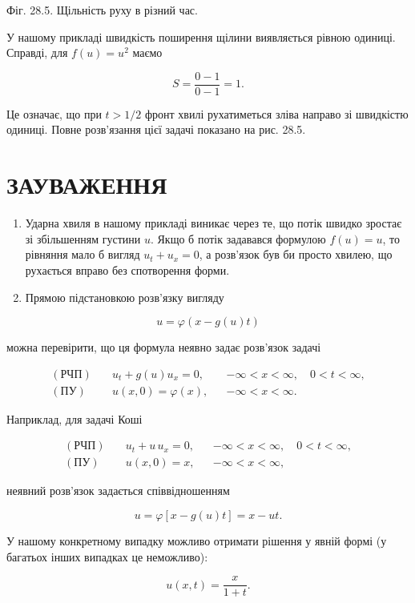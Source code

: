 \documentclass[
  ukrainian,
]{article}
\begin{document}
Фіг. 28.5. Щільність руху в різний час.

У нашому прикладі швидкість поширення щілини виявляється рівною одиниці.
Справді, для \(f(u)=u^2\) маємо

\[
S=\frac{0-1}{0-1}=1.
\]

Це означає, що при \(t>1/2\) фронт хвилі рухатиметься зліва направо зі
швидкістю одиниці. Повне розв'язання цієї задачі показано на рис. 28.5.

\section{ЗАУВАЖЕННЯ}\label{ux437ux430ux443ux432ux430ux436ux435ux43dux43dux44f-10}

\begin{enumerate}
\def\labelenumi{\arabic{enumi}.}
\item
  Ударна хвиля в нашому прикладі виникає через те, що потік швидко
  зростає зі збільшенням густини \(u\). Якщо б потік задавався формулою
  \(f(u)=u\), то рівняння мало б вигляд \(u_t+u_x=0\), а розв'язок був
  би просто хвилею, що рухається вправо без спотворення форми.
\item
  Прямою підстановкою розв'язку вигляду
\end{enumerate}

\[
u=\varphi(x-g(u)t)
\]

можна перевірити, що ця формула неявно задає розв'язок задачі

\[
\begin{aligned}
(\text{РЧП})\quad & u_t + g(u)u_x = 0, && -\infty < x < \infty,\quad 0 < t < \infty,\\
(\text{ПУ})\quad & u(x,0)=\varphi(x), && -\infty < x < \infty.
\end{aligned}
\]

Наприклад, для задачі Коші

\[
\begin{aligned}
(\text{РЧП})\quad & u_t + u\,u_x = 0, && -\infty < x < \infty,\quad 0 < t < \infty,\\
(\text{ПУ})\quad & u(x,0)=x, && -\infty < x < \infty,
\end{aligned}
\]

неявний розв'язок задається співвідношенням

\[
u=\varphi[x-g(u)t]=x-ut.
\]

У нашому конкретному випадку можливо отримати рішення у явній формі (у
багатьох інших випадках це неможливо):

\[
u(x,t)=\frac{x}{1+t}.
\]
\end{document}
